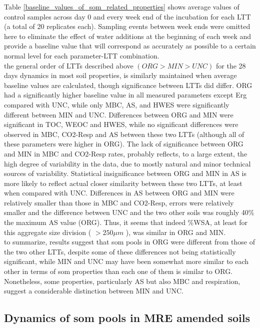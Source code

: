 			Table \ref{baseline_values_of_som_related_properties} shows average values of control samples across day 0 and every week end of the incubation for each LTT (a total of 20 replicates each). Sampling events between week ends were omitted here to eliminate the effect of water additions at the beginning of each week and provide a baseline value that will correspond as accurately as possible to a certain normal level for each parameter-LTT combination.\\
			
			the general order of LTTs described above $\left(ORG > MIN > UNC\right)$ for the 28 days dynamics in most soil properties, is similarly maintained when average baseline values are calculated, though significance between LTTs did differ.
			ORG had a significantly higher baseline value in all measured parameters except Erg compared with UNC, while only MBC, AS, and HWES were significantly different between MIN and UNC.
			Differences between ORG and MIN were significant in TOC, WEOC and HWES, while no significant differences were observed in MBC, CO2-Resp and AS between these two LTTs (although all of these parameters were higher in ORG).
			The lack of significance between ORG and MIN in MBC and CO2-Resp rates, probably reflects, to a large extent, the high degree of variability in the data, due to mostly natural and minor technical sources of variability.  Statistical insignificance between ORG and MIN in AS is more likely to reflect actual closer similarity between these two LTTs, at least when compared with UNC. Differences in AS between ORG and MIN were relatively smaller than those in MBC and CO2-Resp, errors were relatively smaller and the difference between UNC and the two other soils was roughly 40\% the maximum AS value (ORG). Thus, it seems that indeed \%WSA, at least for this aggregate size division ( $ >250\mu m$ ), was similar in ORG and MIN.\\
			to summarize,  results suggest that \gls{som} pools in ORG were different from those of the two other LTTs, despite some of these differences not being statistically significant, while MIN and UNC may have been somewhat more similar to each other in terms of \gls{som} properties than each one of them is similar to ORG. Nonetheless, some properties, particularly AS but also MBC and respiration, suggest a considerable distinction between MIN and UNC. \\



	\subsection{Dynamics of \gls{som} pools in MRE amended soils}

